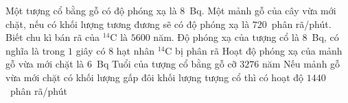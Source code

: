 	\begin{ex}%
		Một tượng cổ bằng gỗ có độ phóng xạ là $8$~Bq. Một mảnh gỗ của cây vừa mới chặt, nếu có khối lượng tương đương sẽ có độ phóng xạ là $720$~phân rã/phút. Biết chu kì bán rã của ${}^{14}\text{C}$ là $5600$ năm.
		\choiceTFt
		{\True Độ phóng xạ của tượng cổ là $8$~Bq, có nghĩa là trong $1$ giây có $8$ hạt nhân ${}^{14}\text{C}$ bị phân rã}
		{Hoạt độ phóng xạ của mảnh gỗ vừa mới chặt là $6$~Bq}
		{\True Tuổi của tượng cổ bằng gỗ cỡ $3276$ năm}
		{\True Nếu mảnh gỗ vừa mới chặt có khối lượng gấp đôi khối lượng tượng cổ thì có hoạt độ $1440$~phân rã/phút}
	\end{ex}

